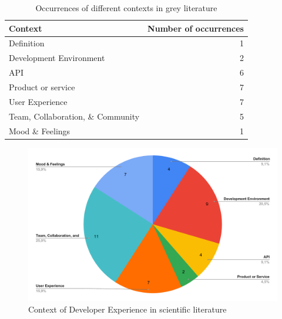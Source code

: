 \documentclass[english, 12pt, a4paper, sci, utf8, a-1b, online]{aaltothesis}
\begin{document}
\begin{table}[ht]
  \begin{center}
    \begin{tabular}{l r}
      Context                           & Number of occurrences \\
      \hline
      Definition                        & 1                     \\
      Development Environment           & 2                     \\
      API                               & 6                     \\
      Product or service                & 7                     \\
      User Experience                   & 7                     \\
      Team, Collaboration, \& Community & 5                     \\
      Mood \& Feelings                  & 1                     \\
      \hline
    \end{tabular}
    \caption{Occurrences of different contexts in grey literature}
  \end{center}
\end{table}

\begin{figure}[ht]
  \caption{Context of Developer Experience in scientific literature}
  \begin{center}
    \includegraphics[width=\textwidth]{context-scientific.pdf}
  \end{center}
\end{figure}
\end{document}
